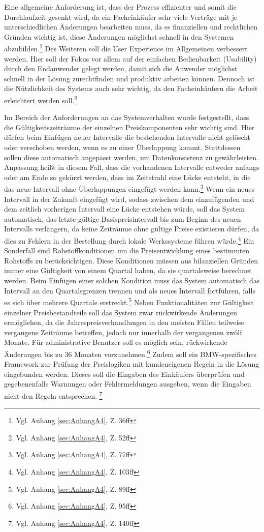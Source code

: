 Eine allgemeine Anforderung ist, dass der Prozess effizienter und somit die Durchlaufzeit gesenkt wird, da ein Facheinkäufer sehr viele Verträge mit je unterschiedlichen Änderungen bearbeiten muss, da es finanziellen und rechtlichen Gründen wichtig ist, diese Änderungen möglichst schnell in den Systemen abzubilden.\footnote{Vgl. Anhang \ref{sec:AnhangA4}, Z. 36ff} Des Weiteren soll die User Experience im Allgemeinen verbessert werden. Hier soll der Fokus vor allem auf der einfachen Bedienbarkeit (Usability) durch den Endanwender gelegt werden, damit sich die Anwender möglichst schnell in der Lösung zurechtfinden und produktiv arbeiten können. Dennoch ist die Nützlichkeit des Systems auch sehr wichtig, da den Facheinkäufern die Arbeit erleichtert werden soll.\footnote{Vgl. Anhang \ref{sec:AnhangA4}, Z. 52ff}

Im Bereich der Anforderungen an das Systemverhalten wurde festgestellt, dass die Gültigkeitszeiträume der einzelnen Preiskomponenten sehr wichtig sind. Hier dürfen beim Einfügen neuer Intervalle die bestehenden Intervalle nicht gelöscht oder verschoben werden, wenn es zu einer Überlappung kommt. Stattdessen sollen diese automatisch angepasst werden, um Datenkonsistenz zu gewährleisten. Anpassung hei\ss t in diesem Fall, dass die vorhandenen Intervalle entweder anfangs oder am Ende so gekürzt werden, dass im Zeitstrahl eine Lücke entsteht, in die das neue Intervall ohne Überlappungen eingefügt werden kann.\footnote{Vgl. Anhang \ref{sec:AnhangA4}, Z. 77ff} Wenn ein neues Intervall in der Zukunft eingefügt wird, sodass zwischen dem einzufügenden und dem zeitlich vorherigen Intervall eine Lücke entstehen würde, soll das System automatisch, das letzte gültige Basispreisintervall bis zum Beginn des neuen Intervalls verlängern, da keine Zeiträume ohne gültige Preise existieren dürfen, da dies zu Fehlern in der Bestellung durch lokale Werkssysteme führen würde.\footnote{Vgl. Anhang \ref{sec:AnhangA4}, Z. 103ff} Ein Sonderfall sind Rohstoffkonditionen um die Preisentwicklung eines bestimmten Rohstoffs zu berücksichtigen. Diese Konditionen müssen aus bilanziellen Gründen immer eine Gültigkeit von einem Quartal haben, da sie quartalsweise berechnet werden. Beim Einfügen einer solchen Kondition muss das System automatisch das Intervall an den Quartalsgrenzen trennen und als neues Intervall fortführen, falls es sich über mehrere Quartale erstreckt.\footnote {Vgl. Anhang \ref{sec:AnhangA4}, Z. 89ff} Neben Funktionalitäten zur Gültigkeit einzelner Preisbestandteile soll das System zwar rückwirkende Änderungen ermöglichen, da die Jahrespreisverhandlungen in den meisten Fällen teilweise vergangene Zeiträume betreffen, jedoch nur innerhalb der vergangenen zwölf Monate. Für administrative Benutzer soll es möglich sein, rückwirkende Änderungen bis zu 36 Monaten vorzunehmen.\footnote{Vgl. Anhang \ref{sec:AnhangA4}, Z. 95ff} Zudem soll ein BMW-spezifisches Framework zur Prüfung der Preislogiken mit kundeneigenen Regeln in die Lösung eingebunden werden. Dieses soll die Eingaben des Einkäufers überprüfen und gegebenenfalls Warnungen oder Fehlermeldungen ausgeben, wenn die Eingaben nicht den Regeln entsprechen. \footnote{Vgl. Anhang \ref{sec:AnhangA4}, Z. 140ff}


